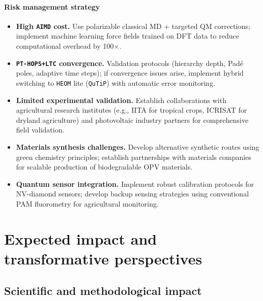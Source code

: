 \documentclass[12pt, a4paper]{article}
\begin{document}
\paragraph{Risk management strategy}
\begin{itemize}
    \item \textbf{High \texttt{AIMD} cost.} Use polarizable classical MD + targeted QM corrections; implement machine learning force fields trained on DFT data to reduce computational overhead by 100×.
    \item \textbf{\texttt{PT-HOPS+LTC} convergence.} Validation protocols (hierarchy depth, Padé poles, adaptive time steps); if convergence issues arise, implement hybrid switching to \texttt{HEOM} lite (\texttt{QuTiP}) with automatic error monitoring.
    \item \textbf{Limited experimental validation.} Establish collaborations with agricultural research institutes (e.g., IITA for tropical crops, ICRISAT for dryland agriculture) and photovoltaic industry partners for comprehensive field validation.
    \item \textbf{Materials synthesis challenges.} Develop alternative synthetic routes using green chemistry principles; establish partnerships with materials companies for scalable production of biodegradable OPV materials.
    \item \textbf{Quantum sensor integration.} Implement robust calibration protocols for NV-diamond sensors; develop backup sensing strategies using conventional PAM fluorometry for agricultural monitoring.
\end{itemize}


\section{Expected impact and transformative perspectives}
\label{sec:impact}

\subsection{Scientific and methodological impact}
\end{document}
